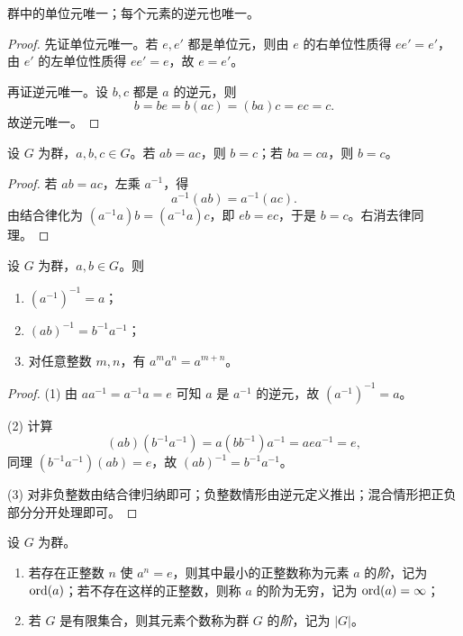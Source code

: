 \begin{lemma}
群中的单位元唯一；每个元素的逆元也唯一。
\end{lemma}

\begin{proof}
先证单位元唯一。若 $e,e'$ 都是单位元，则由 $e$ 的右单位性质得 $ee'=e'$，由 $e'$ 的左单位性质得 $ee'=e$，故 $e=e'$。

再证逆元唯一。设 $b,c$ 都是 $a$ 的逆元，则
\[
 b=be=b(ac)=(ba)c=ec=c.
\]
故逆元唯一。
\end{proof}

\begin{proposition}[消去律]
设 $G$ 为群，$a,b,c \in G$。若 $ab=ac$，则 $b=c$；若 $ba=ca$，则 $b=c$。
\end{proposition}

\begin{proof}
若 $ab=ac$，左乘 $a^{-1}$，得
\[
 a^{-1}(ab)=a^{-1}(ac).
\]
由结合律化为 $(a^{-1}a)b=(a^{-1}a)c$，即 $eb=ec$，于是 $b=c$。右消去律同理。
\end{proof}

\begin{proposition}
设 $G$ 为群，$a,b \in G$。则
\begin{enumerate}[label=\textnormal{(\arabic*)}, leftmargin=3em]
  \item $(a^{-1})^{-1}=a$；
  \item $(ab)^{-1}=b^{-1}a^{-1}$；
  \item 对任意整数 $m,n$，有 $a^m a^n=a^{m+n}$。
\end{enumerate}
\end{proposition}

\begin{proof}
(1) 由 $aa^{-1}=a^{-1}a=e$ 可知 $a$ 是 $a^{-1}$ 的逆元，故 $(a^{-1})^{-1}=a$。

(2) 计算
\[
(ab)(b^{-1}a^{-1})=a(bb^{-1})a^{-1}=aea^{-1}=e,
\]
同理 $(b^{-1}a^{-1})(ab)=e$，故 $(ab)^{-1}=b^{-1}a^{-1}$。

(3) 对非负整数由结合律归纳即可；负整数情形由逆元定义推出；混合情形把正负部分分开处理即可。
\end{proof}

\begin{definition}
设 $G$ 为群。
\begin{enumerate}[label=\textnormal{(\arabic*)}, leftmargin=3em]
  \item 若存在正整数 $n$ 使 $a^n=e$，则其中最小的正整数称为元素 $a$ 的\emph{阶}，记为 $\mathrm{ord}(a)$；若不存在这样的正整数，则称 $a$ 的阶为无穷，记为 $\mathrm{ord}(a)=\infty$；
  \item 若 $G$ 是有限集合，则其元素个数称为群 $G$ 的\emph{阶}，记为 $|G|$。
\end{enumerate}
\end{definition}

